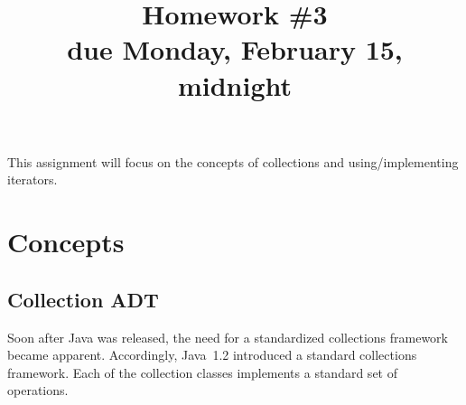 \documentclass[11pt]{article}
\title[Homework \#3]{Homework \#3\\ 
\textbf{due Monday, February 15, midnight}}
\begin{document}
\maketitle
This assignment will focus on the concepts of collections 
and using/implementing iterators.

\section{Concepts}

%
%


\subsection{Collection ADT}

Soon after Java was released, the need for a standardized collections
framework became apparent.  Accordingly, Java~1.2 introduced a
standard collections framework.  Each of the collection classes
implements a standard set of operations.
\end{document}
